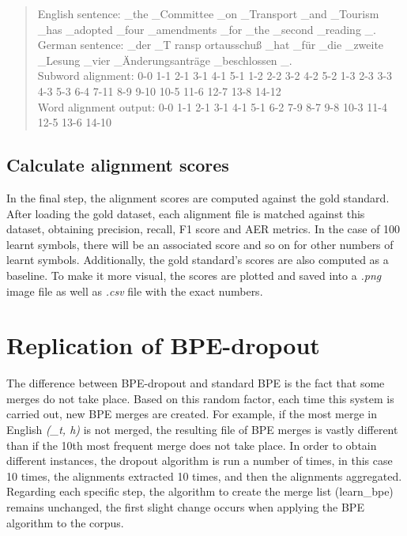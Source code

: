 \begin{quote}
	English sentence: \_the \_Committee \_on \_Transport \_and \_Tourism \_has \_adopted \_four \_amendments \_for \_the \_second \_reading \_.\\
	German sentence: \_der \_T ransp ortausschuß \_hat \_für \_die \_zweite \_Lesung \_vier \_Änderungsanträge \_beschlossen \_.\\
	Subword alignment: 0-0 1-1 2-1 3-1 4-1 5-1 1-2 2-2 3-2 4-2 5-2 1-3 2-3 3-3 4-3 5-3 6-4 7-11 8-9 9-10 10-5 11-6 12-7 13-8 14-12\\
	Word alignment output: 0-0 1-1 2-1 3-1 4-1 5-1 6-2 7-9 8-7 9-8 10-3 11-4 12-5 13-6 14-10
\end{quote}

\subsection{Calculate alignment scores}

In the final step, the alignment scores are computed against the gold standard. After loading the gold dataset, each alignment file is matched against this dataset, obtaining precision, recall, F1 score and AER metrics. In the case of 100 learnt symbols, there will be an associated score and so on for other numbers of learnt symbols. Additionally, the gold standard's scores are also computed as a baseline. To make it more visual, the scores are plotted and saved into a \emph{.png} image file as well as \emph{.csv} file with the exact numbers.

\clearpage
\section{Replication of BPE-dropout}\label{met:replbpedrop}

The difference between BPE-dropout and standard BPE is the fact that some merges do not take place. Based on this random factor, each time this system is carried out, new BPE merges are created. For example, if the most merge in English \emph{(\_t, h)} is not merged, the resulting file of BPE merges is vastly different than if the 10th most frequent merge does not take place. In order to obtain different instances, the dropout algorithm is run a number of times, in this case 10 times, the alignments extracted 10 times, and then the alignments aggregated. Regarding each specific step, the algorithm to create the merge list (learn\_bpe) remains unchanged, the first slight change occurs when applying the BPE algorithm to the corpus.

